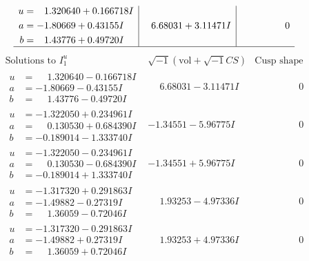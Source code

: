 \documentclass[1p]{elsarticle_modified}
\theoremstyle{definition}
\newcommand{\I}{\sqrt{-1}}
\begin{document}
$$\begin{array}{c|c|c}
\begin{aligned}
u &= \phantom{-}1.320640 + 0.166718 I \\
a &= -1.80669 + 0.43155 I \\
b &= \phantom{-}1.43776 + 0.49720 I\end{aligned}
 & \phantom{-}6.68031 + 3.11471 I & \phantom{-0.000000 } 0\\
 \hline 
 \end{array}$$\newpage$$\begin{array}{c|c|c}  
\text{Solutions to }I^u_{1}& \I (\text{vol} + \sqrt{-1}CS) & \text{Cusp shape}\\
 \hline 
\begin{aligned}
u &= \phantom{-}1.320640 - 0.166718 I \\
a &= -1.80669 - 0.43155 I \\
b &= \phantom{-}1.43776 - 0.49720 I\end{aligned}
 & \phantom{-}6.68031 - 3.11471 I & \phantom{-0.000000 } 0 \\ \hline\begin{aligned}
u &= -1.322050 + 0.234961 I \\
a &= \phantom{-}0.130530 + 0.684390 I \\
b &= -0.189014 - 1.333740 I\end{aligned}
 & -1.34551 - 5.96775 I & \phantom{-0.000000 } 0 \\ \hline\begin{aligned}
u &= -1.322050 - 0.234961 I \\
a &= \phantom{-}0.130530 - 0.684390 I \\
b &= -0.189014 + 1.333740 I\end{aligned}
 & -1.34551 + 5.96775 I & \phantom{-0.000000 } 0 \\ \hline\begin{aligned}
u &= -1.317320 + 0.291863 I \\
a &= -1.49882 - 0.27319 I \\
b &= \phantom{-}1.36059 - 0.72046 I\end{aligned}
 & \phantom{-}1.93253 - 4.97336 I & \phantom{-0.000000 } 0 \\ \hline\begin{aligned}
u &= -1.317320 - 0.291863 I \\
a &= -1.49882 + 0.27319 I \\
b &= \phantom{-}1.36059 + 0.72046 I\end{aligned}
 & \phantom{-}1.93253 + 4.97336 I & \phantom{-0.000000 } 0 \\ \hline\begin{aligned}

\end{aligned}
\end{array}$$
\end{document}
